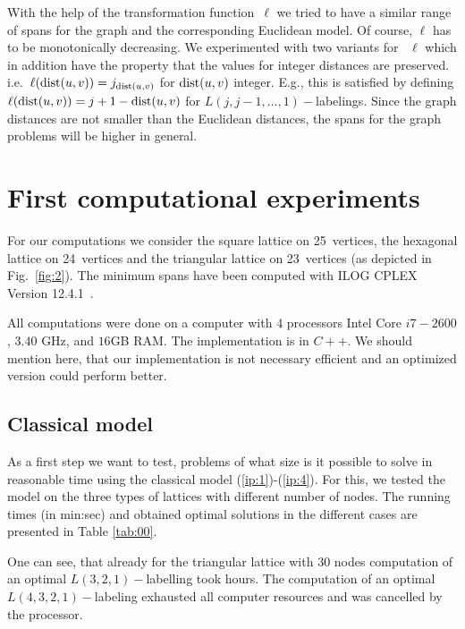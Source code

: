 \documentclass[smallextended]{svjour3}
\def\dist{\mathop{\rm dist}}
\begin{document}
With the help of the transformation function~$\ell$ we tried to have a similar 
range of spans for the graph and the corresponding Euclidean model. 
Of course, $\ell$ has to be monotonically decreasing. We experimented with 
two variants for ~$\ell$ which in addition have the property that the values for 
integer distances are preserved. i.e.\ $\ell(\dist(u,v))=j_{\dist(u,v)}$ for $\dist(u,v)$ integer. 
E.g., this is satisfied by defining $\ell(\dist(u,v))=j+1-\dist(u,v)$ for 
$L(j,j-1,\ldots ,1)-$labelings. 
Since the graph distances are not smaller than the Euclidean distances, the 
spans for the graph problems will be higher in general. 

\section{First computational experiments} 

For our computations we consider the square lattice on 25~vertices, the hexagonal 
lattice on 24~vertices and the triangular lattice on 23~vertices (as depicted in Fig.~\ref{fig:2}). 
The minimum spans have been computed with ILOG CPLEX Version 12.4.1~\cite{Cpl15}. 

All computations were done on a computer with $4$ processors Intel Core $i7-2600$, $3.40$ GHz, and $16$GB RAM. The implementation is in $C++$. We should mention here, that our implementation is not necessary efficient and an optimized version could perform better. 

\subsection{Classical model} 

As a first step we want to test, problems of what size is it possible to solve in reasonable time using the classical model (\ref{ip:1})-(\ref{ip:4}). 
For this, we tested the model on the three types of lattices with different number of nodes. The running times (in min:sec) and obtained optimal solutions in the different cases 
are presented in Table \ref{tab:00}. 

One can see, that already for the triangular lattice with $30$ nodes computation of an optimal $L(3,2,1)-$labelling took hours. The computation of an optimal $L(4,3,2,1)-$labeling exhausted all computer resources and was cancelled by the processor. 
\end{document}
